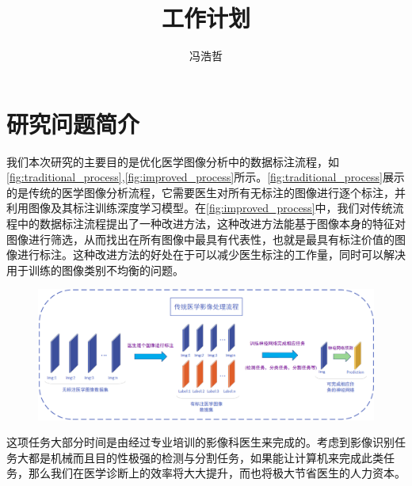 \documentclass[UTF8]{ctexart}
\title{工作计划}
\author{冯浩哲}
\begin{document}
\section{研究问题简介}

我们本次研究的主要目的是优化医学图像分析中的数据标注流程，如\ref{fig:traditional_process},\ref{fig:improved_process}所示。\ref{fig:traditional_process}展示的是传统的医学图像分析流程，它需要医生对所有无标注的图像进行逐个标注，并利用图像及其标注训练深度学习模型。在\ref{fig:improved_process}中，我们对传统流程中的数据标注流程提出了一种改进方法，这种改进方法能基于图像本身的特征对图像进行筛选，从而找出在所有图像中最具有代表性，也就是最具有标注价值的图像进行标注。这种改进方法的好处在于可以减少医生标注的工作量，同时可以解决用于训练的图像类别不均衡的问题。

    \begin{figure}[!h]
        \centering
        \includegraphics[width=1\linewidth]{traditional_process.png}
    \end{figure}



这项任务大部分时间是由经过专业培训的影像科医生来完成的。考虑到影像识别任务大都是机械而且目的性极强的检测与分割任务，如果能让计算机来完成此类任务，那么我们在医学诊断上的效率将大大提升，而也将极大节省医生的人力资本。


\end{document}
